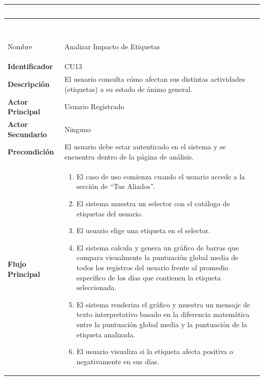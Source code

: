 \begingroup
\small 
\renewcommand{\arraystretch}{1.4}
\begin{xltabular}{\textwidth}{|>{\bfseries}p{3.5cm}|X|}
    \textcolor{white}{Campo} & \textcolor{white}{Descripción} \\ \hline
    \endfirsthead

     \\
    \hline
    \textcolor{white}{Campo} & \textcolor{white}{Descripción} \\ \hline
    \endhead

    Nombre & Analizar Impacto de Etiquetas \\ \hline
    Identificador & CU13 \\ \hline
    Descripción & El usuario consulta cómo afectan sus distintas actividades (etiquetas) a su estado de ánimo general. \\ \hline
    Actor Principal & Usuario Registrado \\ \hline
    Actor Secundario & Ninguno \\ \hline
    Precondición & El usuario debe estar autenticado en el sistema y se encuentra dentro de la página de análisis. \\ \hline
    Flujo Principal & 
    \begin{enumerate}[leftmargin=0.5cm, topsep=0pt, partopsep=0pt, parsep=0pt, itemsep=4pt]
        \item El caso de uso comienza cuando el usuario accede a la sección de ``Tus Aliados''.
        \item El sistema muestra un selector con el catálogo de etiquetas del usuario.
        \item El usuario elige una etiqueta en el selector.
        \item El sistema calcula y genera un gráfico de barras que compara visualmente la puntuación global media de todos los registros del usuario frente al promedio específico de los días que contienen la etiqueta seleccionada.
        \item El sistema renderiza el gráfico y muestra un mensaje de texto interpretativo basado en la diferencia matemática entre la puntuación global media y la puntuación de la etiqueta analizada.
        \item El usuario visualiza si la etiqueta afecta positiva o negativamente en sus días.
    \end{enumerate} 

\end{xltabular}
